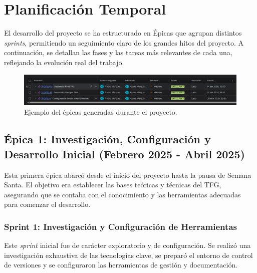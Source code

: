 \section{Planificación Temporal}
\label{sec:plan_temporal}
El desarrollo del proyecto se ha estructurado en Épicas que agrupan distintos \textit{sprints}, permitiendo un seguimiento claro de los grandes hitos del proyecto. A continuación, se detallan las fases y las tareas más relevantes de cada una, reflejando la evolución real del trabajo.

\begin{figure}[H]
    \centering
    \includegraphics[width=\textwidth]{img/jira3.png}
    \caption{Ejemplo del épicas generadas durante el proyecto.}
    \label{fig:anexo_a_jira_epicas}
\end{figure}

\subsection{Épica 1: Investigación, Configuración y Desarrollo Inicial (Febrero 2025 - Abril 2025)}
\label{epic:1}
Esta primera épica abarcó desde el inicio del proyecto hasta la pausa de Semana Santa. El objetivo era establecer las bases teóricas y técnicas del TFG, asegurando que se contaba con el conocimiento y las herramientas adecuadas para comenzar el desarrollo.

\subsubsection{Sprint 1: Investigación y Configuración de Herramientas}
Este \textit{sprint} inicial fue de carácter exploratorio y de configuración. Se realizó una investigación exhaustiva de las tecnologías clave, se preparó el entorno de control de versiones y se configuraron las herramientas de gestión y documentación.

